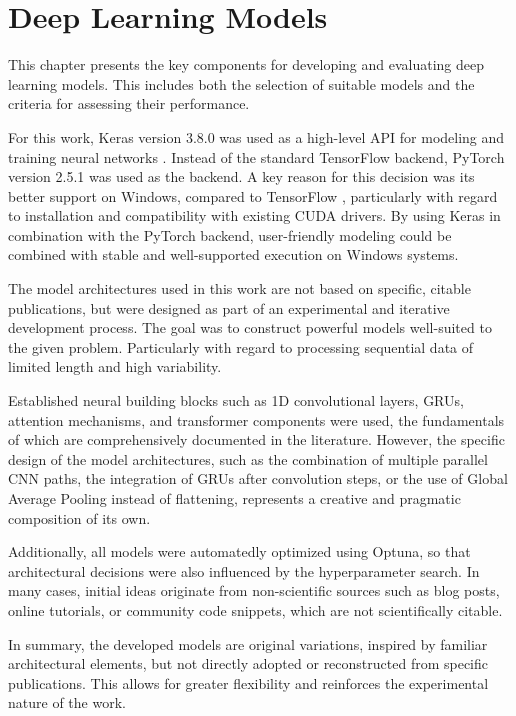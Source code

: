 \section{Deep Learning Models}

This chapter presents the key components for developing and evaluating deep learning models.
This includes both the selection of suitable models and the criteria for assessing their performance.

For this work, Keras version 3.8.0 was used as a high-level API for modeling and training neural networks \cite{keras-home}.
Instead of the standard TensorFlow backend, PyTorch version 2.5.1 was used as the backend.
A key reason for this decision was its better support on Windows, compared to TensorFlow \cite{tf-windows}, particularly with regard to installation and compatibility with existing CUDA drivers.
By using Keras in combination with the PyTorch backend, user-friendly modeling could be combined with stable and well-supported execution on Windows systems.


The model architectures used in this work are not based on specific, citable publications, but were designed as part of an experimental and iterative development process.
The goal was to construct powerful models well-suited to the given problem.
Particularly with regard to processing sequential data of limited length and high variability.

Established neural building blocks such as 1D convolutional layers, GRUs, attention mechanisms, and transformer components were used, the fundamentals of which are comprehensively documented in the literature.
However, the specific design of the model architectures, such as the combination of multiple parallel CNN paths, the integration of GRUs after convolution steps, or the use of Global Average Pooling instead of flattening, represents a creative and pragmatic composition of its own.

Additionally, all models were automatedly optimized using Optuna, so that architectural decisions were also influenced by the hyperparameter search.
In many cases, initial ideas originate from non-scientific sources such as blog posts, online tutorials, or community code snippets, which are not scientifically citable.

In summary, the developed models are original variations, inspired by familiar architectural elements, but not directly adopted or reconstructed from specific publications.
This allows for greater flexibility and reinforces the experimental nature of the work.

